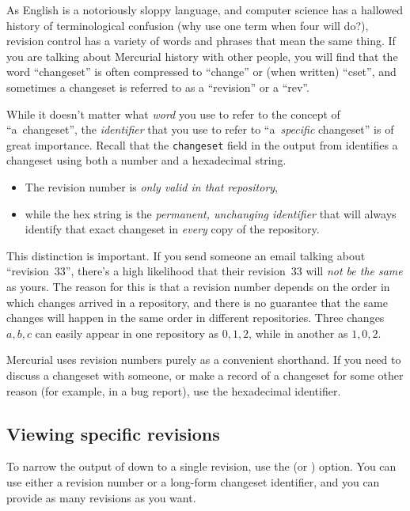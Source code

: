 As English is a notoriously sloppy language, and computer science has
a hallowed history of terminological confusion (why use one term when
four will do?), revision control has a variety of words and phrases
that mean the same thing.  If you are talking about Mercurial history
with other people, you will find that the word ``changeset'' is often
compressed to ``change'' or (when written) ``cset'', and sometimes a
changeset is referred to as a ``revision'' or a ``rev''.

While it doesn't matter what \emph{word} you use to refer to the
concept of ``a~changeset'', the \emph{identifier} that you use to
refer to ``a~\emph{specific} changeset'' is of great importance.
Recall that the \texttt{changeset} field in the output from
 identifies a changeset using both a number and a
hexadecimal string.
\begin{itemize}
\item The revision number is \emph{only valid in that repository},
\item while the hex string is the \emph{permanent, unchanging
    identifier} that will always identify that exact changeset in
  \emph{every} copy of the repository.
\end{itemize}
This distinction is important.  If you send someone an email talking
about ``revision~33'', there's a high likelihood that their
revision~33 will \emph{not be the same} as yours.  The reason for this
is that a revision number depends on the order in which changes
arrived in a repository, and there is no guarantee that the same
changes will happen in the same order in different repositories.
Three changes $a,b,c$ can easily appear in one repository as $0,1,2$,
while in another as $1,0,2$.

Mercurial uses revision numbers purely as a convenient shorthand.  If
you need to discuss a changeset with someone, or make a record of a
changeset for some other reason (for example, in a bug report), use
the hexadecimal identifier.

\subsection{Viewing specific revisions}

To narrow the output of  down to a single revision, use the
 (or ) option.  You can use either a
revision number or a long-form changeset identifier, and you can
provide as many revisions as you want.  

